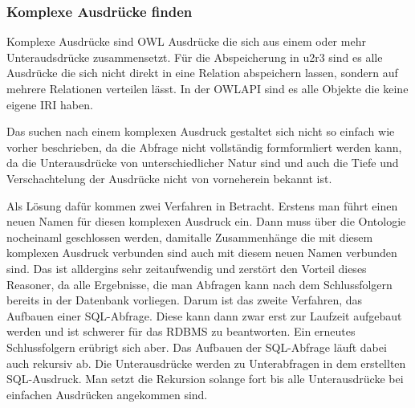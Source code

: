 \subsubsection{Komplexe Ausdrücke finden}

Komplexe Ausdrücke sind OWL Ausdrücke die sich aus einem oder mehr Unteraudsdrücke zusammensetzt. Für die Abspeicherung in u2r3 sind es alle Ausdrücke die sich nicht direkt in eine Relation abspeichern lassen, sondern auf mehrere Relationen verteilen lässt. In der OWLAPI sind es alle Objekte die keine eigene IRI haben.

Das suchen nach einem komplexen Ausdruck gestaltet sich nicht so einfach wie vorher beschrieben, da die Abfrage nicht vollständig formformliert werden kann, da die Unterausdrücke von unterschiedlicher Natur sind und auch die Tiefe und Verschachtelung der Ausdrücke nicht von vorneherein bekannt ist.

Als Lösung dafür kommen zwei Verfahren in Betracht. Erstens man führt einen neuen Namen für diesen komplexen Ausdruck ein. Dann muss über die Ontologie nocheinaml geschlossen werden, damitalle Zusammenhänge die mit diesem komplexen Ausdruck verbunden sind auch mit diesem neuen Namen verbunden sind. Das ist alldergins sehr zeitaufwendig und zerstört den Vorteil dieses Reasoner, da alle Ergebnisse, die man Abfragen kann nach dem Schlussfolgern bereits in der Datenbank vorliegen.
Darum ist das zweite Verfahren, das Aufbauen einer SQL-Abfrage. Diese kann dann zwar erst zur Laufzeit aufgebaut werden und ist schwerer für das RDBMS zu beantworten. Ein erneutes Schlussfolgern erübrigt sich aber. Das Aufbauen der SQL-Abfrage läuft dabei auch rekursiv ab. Die Unterausdrücke werden zu Unterabfragen in dem erstellten SQL-Ausdruck. Man setzt die Rekursion solange fort bis alle Unterausdrücke bei einfachen Ausdrücken angekommen sind.